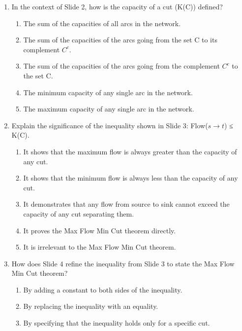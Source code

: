 \documentclass{article}%
\begin{document}
\begin{enumerate}
\begin{enumerate}
\begin{enumerate}
\item The maximum flow in a network is always greater than the capacity of any cut.%
\item There is no relationship between the maximum flow and the minimum cut capacity.%
\end{enumerate}%
\vspace{0.5em}%
\item In the context of Slide 2, how is the capacity of a cut (K(C)) defined?%
\begin{enumerate}%
\item The sum of the capacities of all arcs in the network.%
\item The sum of the capacities of the arcs going from the set C to its complement $C^c$.%
\item The sum of the capacities of the arcs going from the complement $C^c$ to the set C.%
\item The minimum capacity of any single arc in the network.%
\item The maximum capacity of any single arc in the network.%
\end{enumerate}%
\vspace{0.5em}%
\item Explain the significance of the inequality shown in Slide 3:  Flow($s \to t$) ≤ K(C).%
\begin{enumerate}%
\item It shows that the maximum flow is always greater than the capacity of any cut.%
\item It shows that the minimum flow is always less than the capacity of any cut.%
\item It demonstrates that any flow from source to sink cannot exceed the capacity of any cut separating them.%
\item It proves the Max Flow Min Cut theorem directly.%
\item It is irrelevant to the Max Flow Min Cut theorem.%
\end{enumerate}%
\vspace{0.5em}%
\item How does Slide 4 refine the inequality from Slide 3 to state the Max Flow Min Cut theorem?%
\begin{enumerate}%
\item By adding a constant to both sides of the inequality.%
\item By replacing the inequality with an equality.%
\item By specifying that the inequality holds only for a specific cut.%

\end{enumerate}
\end{enumerate}
\end{enumerate}
\end{document}
